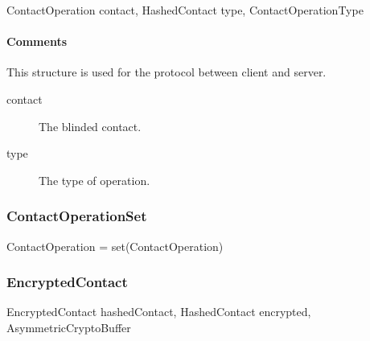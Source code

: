 \documentclass[a4paper,10pt]{article}
\begin{document}
\begin{verbbox}
ContactOperation
{
  contact, HashedContact
  type, ContactOperationType
}
\end{verbbox}
\begin{center}
\theverbbox
\end{center}

\begin{inparaitem}[ ]
 \item \infrastructure
\end{inparaitem}

\SpecialItem\paragraph*{Comments}
This structure is used for the protocol between client and server.

\begin{description}
 \item[contact] The blinded contact.
 \item[type] The type of operation.
\end{description}

\subsubsection{ContactOperationSet}

\begin{verbbox}
ContactOperation = set(ContactOperation)
\end{verbbox}
\begin{center}
\theverbbox
\end{center}

\begin{inparaitem}[ ]
 \item \unsecure
\end{inparaitem}

\subsubsection{EncryptedContact}

\begin{verbbox}
EncryptedContact
{
  hashedContact, HashedContact
  encrypted, AsymmetricCryptoBuffer
}
\end{verbbox}
\begin{center}
\theverbbox
\end{center}

\begin{inparaitem}[ ]
 \item \infrastructure
\end{inparaitem}
\end{document}
